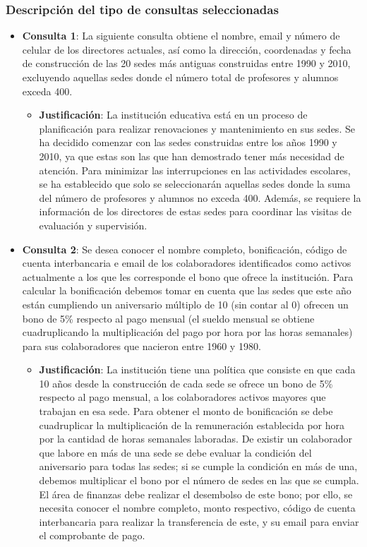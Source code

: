 \subsubsection{Descripción del tipo de consultas seleccionadas} %
\begin{itemize}
    \item{\textbf{Consulta 1}: La siguiente consulta obtiene el nombre, email y número de celular de los directores actuales, así como la dirección, coordenadas y fecha de construcción de las 20 sedes más antiguas construidas entre 1990 y 2010, excluyendo aquellas sedes donde el número total de profesores y alumnos exceda 400.}
          \begin{itemize}
              \item{\textbf{Justificación}: La institución educativa está en un proceso de planificación para realizar renovaciones y mantenimiento en sus sedes. Se ha decidido comenzar con las sedes construidas entre los años 1990 y 2010, ya que estas son las que han demostrado tener más necesidad de atención. Para minimizar las interrupciones en las actividades escolares, se ha establecido que solo se seleccionarán aquellas sedes donde la suma del número de profesores y alumnos no exceda 400. Además, se requiere la información de los directores de estas sedes para coordinar las visitas de evaluación y supervisión.}
          \end{itemize}
    \item{\textbf{Consulta 2}: Se desea conocer el nombre completo, bonificación, código de cuenta interbancaria e email de los colaboradores identificados como activos actualmente a los que les corresponde el bono que ofrece la institución. Para calcular la bonificación debemos tomar en cuenta que las sedes que este año están cumpliendo un aniversario múltiplo de 10 (sin contar al 0) ofrecen un bono de 5\% respecto al pago mensual (el sueldo mensual se obtiene cuadruplicando la multiplicación del pago por hora por las horas semanales) para sus colaboradores que nacieron entre 1960 y 1980.}
          \begin{itemize}
              \item{\textbf{Justificación}: La institución tiene una política que consiste en que cada 10 años desde la construcción de cada sede se ofrece un bono de 5\% respecto al pago mensual, a los colaboradores activos mayores que trabajan en esa sede. Para obtener el monto de bonificación se debe cuadruplicar la multiplicación de la remuneración establecida por hora por la cantidad de horas semanales laboradas. De existir un colaborador que labore en más de una sede se debe evaluar la condición del aniversario para todas las sedes; si se cumple la condición en más de una, debemos multiplicar el bono por el número de sedes en las que se cumpla. El área de finanzas debe realizar el desembolso de este bono; por ello, se necesita conocer el nombre completo, monto respectivo, código de cuenta interbancaria para realizar la transferencia de este, y su email para enviar el comprobante de pago. }

\end{itemize}
\end{itemize}
